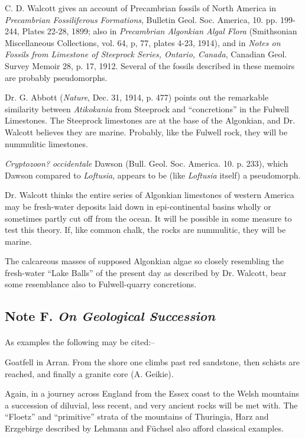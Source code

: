 \documentclass[a4paper, 12pt, oneside]{article}
\begin{document}
C. D. Walcott gives an account of Precambrian fossils of North America in \emph{Precambrian Fossiliferous Formations}, Bulletin Geol. Soc. America, 10. pp. 199-244, Plates 22-28, 1899; also in \emph{Precambrian Algonkian Algal Flora} (Smithsonian Miscellaneous Collections, vol. 64, p, 77, plates 4-23, 1914), and in \emph{Notes on Fossils from Limestone of Steeprock Series, Ontario, Canada}, Canadian Geol. Survey Memoir 28, p. 17, 1912. Several of the fossils described in these memoirs are probably pseudomorphs.

Dr. G. Abbott (\emph{Nature}, Dec. 31, 1914, p. 477) points out the remarkable similarity between \emph{Atikokania} from Steeprock and ``concretions'' in the Fulwell Limestones. The Steeprock limestones are at the base of the Algonkian, and Dr. Walcott believes they are marine. Probably, like the Fulwell rock, they will be nummulitic limestones.

\emph{Cryptozoon? occidentale} Dawson (Bull. Geol. Soc. America. 10. p. 233), which Dawson compared to \emph{Loftusia}, appears to be (like \emph{Loftusia} itself) a pseudomorph.

Dr. Walcott thinks the entire series of Algonkian limestones of western America may be fresh-water deposits laid down in epi-continental basins wholly or sometimes partly cut off from the ocean. It will be possible in some measure to test this theory. If, like common chalk, the rocks are nummulitic, they will be marine.

The calcareous masses of supposed Algonkian algae so closely resembling the fresh-water ``Lake Balls'' of the present day as described by Dr. Walcott, bear some resemblance also to Fulwell-quarry concretions.

\subsection{Note F. \emph{On Geological Succession}}
\paragraph{}
As examples the following may be cited:--

Goatfell in Arran. From the shore one climbs past red sandstone, then schists are reached, and finally a granite core (A. Geikie).

Again, in a journey across England from the Essex coast to the Welsh mountains a succession of diluvial, less recent, and very ancient rocks will be met with. The ``Floetz'' and ``primitive'' strata of the mountains of Thuringia, Harz and Erzgebirge described by Lehmann and Füchsel also afford classical examples.
\end{document}
